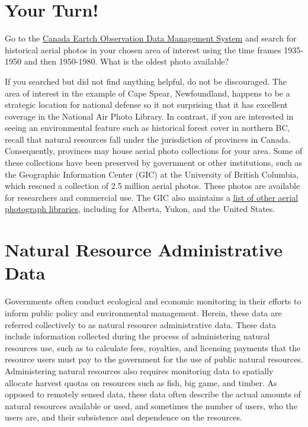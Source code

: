 \documentclass[
]{book}
\begin{document}
\section*{Your Turn!}\label{your-turn-3}

Go to the \href{https://www.eodms-sgdot.nrcan-rncan.gc.ca/index-en.html}{Canada Eartch Observation Data Management System} and search for historical aerial photos in your chosen area of interest using the time frames 1935-1950 and then 1950-1980. What is the oldest photo available?

If you searched but did not find anything helpful, do not be discouraged. The area of interest in the example of Cape Spear, Newfoundland, happens to be a strategic location for national defense so it not surprising that it has excellent coverage in the National Air Photo Library. In contrast, if you are interested in seeing an environmental feature such as historical forest cover in northern BC, recall that natural resources fall under the jurisdiction of provinces in Canada. Consequently, provinces may house aerial photo collections for your area. Some of these collections have been preserved by government or other institutions, such as the Geographic Information Center (GIC) at the University of British Columbia, which rescued a collection of 2.5 million aerial photos. These photos are available for researchers and commercial use. The GIC also maintains a \href{https://gic.geog.ubc.ca/resources/air-photo-collection-and-services/other-sources-of-air-photo-information/}{list of other aerial photograph libraries}, including for Alberta, Yukon, and the United States.

\section{Natural Resource Administrative Data}\label{natural-resource-administrative-data}

Governments often conduct ecological and economic monitoring in their efforts to inform public policy and environmental management. Herein, these data are referred collectively to as natural resource administrative data. These data include information collected during the process of administering natural resources use, such as to calculate fees, royalties, and licensing payments that the resource users must pay to the government for the use of public natural resources. Administering natural resources also requires monitoring data to spatially allocate harvest quotas on resources such as fish, big game, and timber. As opposed to remotely sensed data, these data often describe the actual amounts of natural resources available or used, and sometimes the number of users, who the users are, and their subsistence and dependence on the resources.
\end{document}
